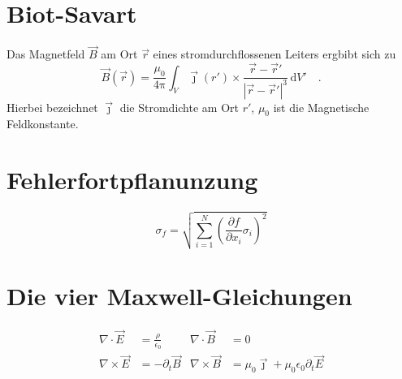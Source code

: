 \documentclass{scrartcl}
\begin{document}
\section{Biot-Savart}
Das Magnetfeld $\vec{B}$ am Ort $\vec{r}$ eines stromdurchflossenen Leiters ergbibt sich zu
\begin{equation}
  \vec{B}(\vec{r}) = \frac{\mu_0}{4\mathup{\pi}}
  \int_V  \vec{\jmath}(r') \times \frac{\vec{r}-\vec{r}'}{|\vec{r}-\vec{r}'|^3} \, \mathup{d}V' \quad .
\end{equation}
Hierbei bezeichnet $\vec{\jmath}$ die Stromdichte am Ort $r'$, $\mu_0$ ist die Magnetische Feldkonstante.

\section{Fehlerfortpflanunzung}

\begin{equation}
\sigma_f = \sqrt{\sum\limits_{i=1}^N \left( \frac{\partial f}{\partial x_i}
                 \sigma_i \right)^2}
\end{equation}



\section{Die vier Maxwell-Gleichungen}
\begin{align}
  \nabla \cdot \vec{E} &= \frac{\rho}{\epsilon_0} &
  \nabla \cdot \vec{B} &= 0 \\
  \nabla \times \vec{E} &= - \partial_t \vec{B} &
  \nabla \times \vec{B} &= \mu_0 \vec{\jmath} + \mu_0 \epsilon_0 \partial_t \vec{E} 
\end{align}
\end{document}
